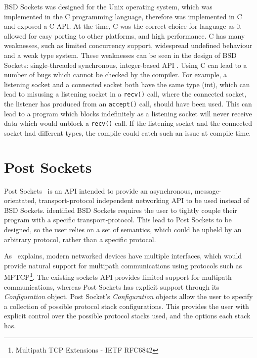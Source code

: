 BSD Sockets was designed for the Unix operating system, which was implemented in the C programming language, therefore
was implemented in C and exposed a C API.
At the time, C was the correct choice for language as it allowed for easy porting to other platforms, and high
performance.
C has many weaknesses, such as limited concurrency support, widespread undefined behaviour and a weak type system.
These weaknesses can be seen in the design of BSD Sockets: single-threaded synchronous, integer-based API .
Using C can lead to a number of bugs which cannot be checked by the compiler.
For example, a listening socket and a connected socket both have the same type (int), which can lead to misusing a
listening socket in a \texttt{recv()} call, where the connected socket, the listener has produced from an
\texttt{accept()} call, should have been used.
This can lead to a program which blocks indefinitely as a listening socket will never receive data which would unblock
a \texttt{recv()} call.
If the listening socket and the connected socket had different types, the compile could catch such an issue at compile
time.

\section{Post Sockets}\label{sec:post-sockets}
Post Sockets~\citep{kuhlewind_postsocketsabstract_} is an API intended to provide an asynchronous, message-orientated,
transport-protocol independent networking API to be used instead of BSD Sockets.
\citet{kuhlewind_postsocketsabstract_} identified BSD Sockets requires the user to tightly couple their program with a
specific transport-protocol.
This lead to Post Sockets to be designed, so the user relies on a set of semantics, which could be upheld by an
arbitrary protocol, rather than a specific protocol.

As~\cite{kuhlewind_postsocketsabstract_} explains, modern networked devices have multiple interfaces, which would
provide natural support for multipath communications using protocols such as
MPTCP\footnote{Multipath TCP Extensions - IETF RFC6842}.
The existing sockets API provides limited support for multipath communications, whereas Post Sockets has explicit
support through its \emph{Configuration} object.
Post Socket's \emph{Configuration} objects allow the user to specify a collection of possible protocol stack
configurations.
This provides the user with explicit control over the possible protocol stacks used, and the options each stack has.

